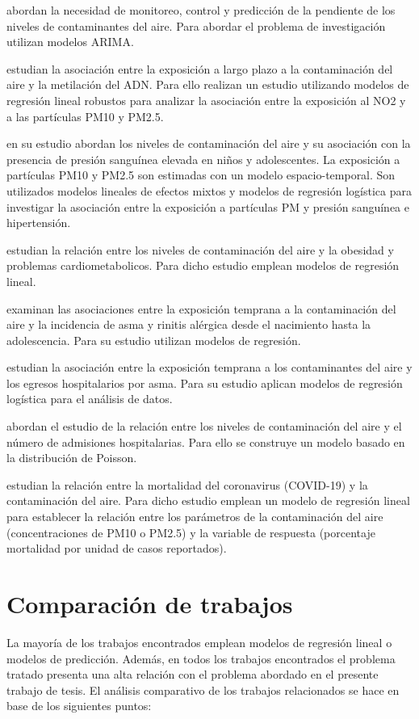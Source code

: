 \citet{r13} abordan la necesidad de monitoreo, control y predicción de la pendiente de los niveles de contaminantes del aire. Para abordar el problema de investigación utilizan modelos ARIMA. 

\citet{r14} estudian la asociación entre la exposición a largo plazo a la contaminación del aire y la metilación del ADN. Para ello realizan un estudio utilizando modelos de regresión lineal robustos para analizar la asociación entre la exposición al NO2 y a las partículas PM10 y PM2.5.

\citet{r15} en su estudio abordan los niveles de contaminación del aire y su asociación con la presencia de presión sanguínea elevada en niños y adolescentes. La exposición a partículas PM10 y PM2.5 son estimadas con un modelo espacio-temporal. Son utilizados modelos lineales de efectos mixtos y modelos de regresión logística para investigar la asociación entre la exposición a partículas PM y presión sanguínea e hipertensión. 

\citet{r16} estudian la relación entre los niveles de contaminación del aire y la obesidad y problemas cardiometabolicos. Para dicho estudio emplean modelos de regresión lineal.

\citet{r17} examinan las asociaciones entre la exposición temprana a la contaminación del aire y la incidencia de asma y rinitis alérgica desde el nacimiento hasta la adolescencia. Para su estudio utilizan modelos de regresión.

\citet{r18} estudian la asociación entre la exposición temprana a los contaminantes del aire y los egresos hospitalarios por asma. Para su estudio aplican modelos de regresión logística para el análisis de datos. 

\citet{r19} abordan el estudio de la relación entre los niveles de contaminación del aire y el número de admisiones hospitalarias. Para ello se construye un modelo basado en la distribución de Poisson.

\citet{r20} estudian la relación entre la mortalidad del coronavirus (COVID-19) y la contaminación del aire. Para dicho estudio emplean un modelo de regresión lineal para establecer la relación entre los parámetros de la contaminación del aire (concentraciones de PM10 o PM2.5) y la variable de respuesta (porcentaje
mortalidad por unidad de casos reportados).
\clearpage

\section{Comparación de trabajos}
La mayoría de los trabajos encontrados emplean modelos de regresión lineal o modelos de predicción. Además, en todos los trabajos encontrados el problema tratado presenta una alta relación con el problema abordado en el presente trabajo de tesis. El análisis comparativo de los trabajos relacionados se hace en base de los siguientes puntos:

